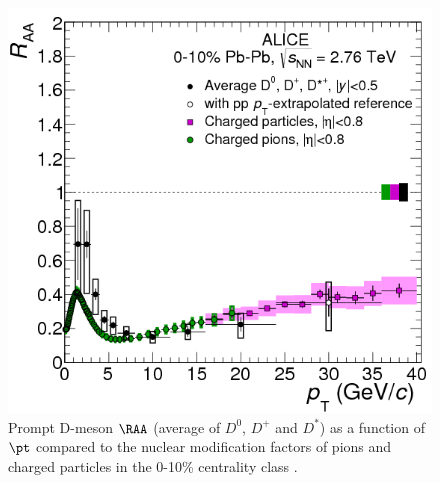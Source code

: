 \begin{figure}
  \centering
  \includegraphics[scale=0.42]{figures/DvsPioni.png}
  \caption{Prompt D-meson $\RAA$ (average of $D^0$, $D^+$ and $D^*$) as a function of $\pt$ compared to the nuclear modification factors of pions and charged particles in the 0-10\% centrality class \cite{open}.}
  \label{fig:dpi}
\end{figure}
%
%
